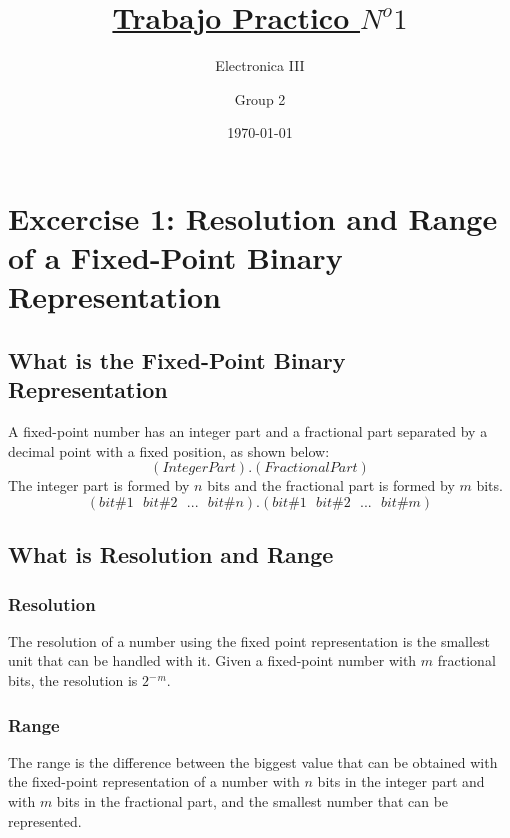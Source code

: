 \documentclass[a4paper,12pt]{report}
\begin{document}
\title{\color{magenta}\underline {Trabajo Practico $N^o 1$}}
\author{Electronica III}
\author{\color{teal}Group 2}
\date{\color{blue}\today} %

\maketitle

\section{\color{olive}Excercise 1: Resolution and Range of a Fixed-Point Binary Representation}

\subsection{\color{purple}What is the Fixed-Point Binary Representation}
A fixed-point number has an integer part and a fractional part separated by a decimal point with a fixed position, as shown below:
$$ (Integer Part).(Fractional Part)$$
The integer part is formed by $n$ bits and the fractional part is formed by $m$ bits.
$$ (bit \#1\ \ \ bit \#2\ \ \ ...\ \ \ bit \#n).(bit \#1\ \ \ bit \#2\ \ \ ...\ \ \ bit \#m)$$

\subsection{\color{purple}What is Resolution and Range}
\subsubsection{\color{red}Resolution}
The resolution of a number using the fixed point representation is the smallest unit that can be handled with it.
Given a fixed-point number with $m$ fractional bits, the resolution is $2^- $$^m$. %
\subsubsection{\color{red}Range}
The range is the difference between the biggest value that can be obtained with the fixed-point representation of a number with $n$ bits in the integer part and with $m$ bits in the fractional part, and the smallest number that can be represented.
\end{document}
